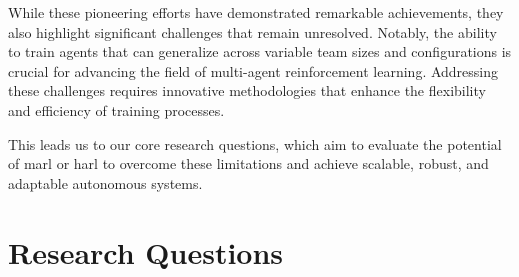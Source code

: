While these pioneering efforts have demonstrated remarkable achievements, 
they also highlight significant challenges that remain unresolved. 
Notably, the ability to train agents that can generalize across variable 
team sizes and configurations is crucial for advancing the field of 
multi-agent reinforcement learning. Addressing these challenges requires 
innovative methodologies that enhance the flexibility and efficiency of 
training processes. 

This leads us to our core research questions, which aim to evaluate
the potential of \gls{marl} or \gls{harl} to overcome these limitations 
and achieve scalable, robust, and adaptable autonomous systems.

%

\section{Research Questions}%
\label{sec:research_question}%
\label{sec:relevance_and_importance}

